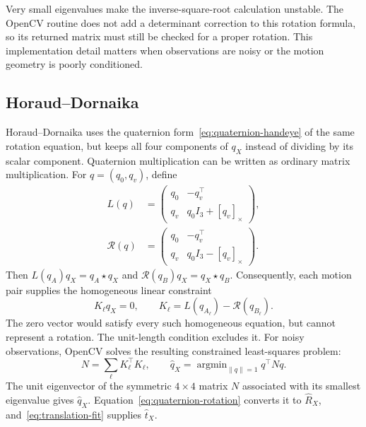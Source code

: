 \documentclass[12pt,a4paper]{article}
\newcommand{\crossmat}[1]{[#1]_{\times}}
\begin{document}
Very small eigenvalues make the inverse-square-root calculation unstable. The OpenCV routine does not add a determinant correction to this rotation formula, so its returned matrix must still be checked for a proper rotation. This implementation detail matters when observations are noisy or the motion geometry is poorly conditioned. \cite{park,opencvsource}

\subsection{Horaud--Dornaika}
Horaud--Dornaika uses the quaternion form~\eqref{eq:quaternion-handeye} of the same rotation equation, but keeps all four components of $q_X$ instead of dividing by its scalar component. Quaternion multiplication can be written as ordinary matrix multiplication. For $q=(q_0,q_v)$, define
\begin{equation}\label{eq:quaternion-matrices}
\begin{aligned}
L(q)&=\begin{pmatrix}q_0&-q_v^\top\\q_v&q_0I_3+\crossmat{q_v}\end{pmatrix},\\
\mathcal R(q)&=\begin{pmatrix}q_0&-q_v^\top\\q_v&q_0I_3-\crossmat{q_v}\end{pmatrix}.
\end{aligned}
\end{equation}
Then $L(q_A)q_X=q_A\star q_X$ and $\mathcal R(q_B)q_X=q_X\star q_B$. Consequently, each motion pair supplies the homogeneous linear constraint
\begin{equation}\label{eq:horaud-linear}
K_\ell q_X=0,\qquad K_\ell=L(q_{A_\ell})-\mathcal R(q_{B_\ell}).
\end{equation}
The zero vector would satisfy every such homogeneous equation, but cannot represent a rotation. The unit-length condition excludes it. For noisy observations, OpenCV solves the resulting constrained least-squares problem:
\begin{equation}\label{eq:horaud}
N=\sum_\ell K_\ell^\top K_\ell,\qquad
\widehat q_X=\mathop{\arg\min}_{\|q\|=1}q^\top Nq.
\end{equation}
The unit eigenvector of the symmetric $4\times4$ matrix $N$ associated with its smallest eigenvalue gives $\widehat q_X$. Equation~\eqref{eq:quaternion-rotation} converts it to $\widehat R_X$, and~\eqref{eq:translation-fit} supplies $\widehat t_X$.
\end{document}

